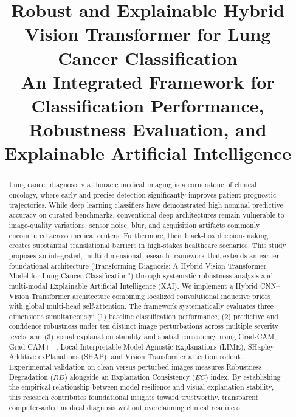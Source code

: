 \documentclass[conference]{IEEEtran}
\begin{document}
\title{Robust and Explainable Hybrid Vision Transformer for Lung Cancer Classification\\
\large An Integrated Framework for Classification Performance, Robustness Evaluation, and Explainable Artificial Intelligence}

\author{
}

\maketitle

\begin{abstract}
Lung cancer diagnosis via thoracic medical imaging is a cornerstone of clinical oncology, where early and precise detection significantly improves patient prognostic trajectories. While deep learning classifiers have demonstrated high nominal predictive accuracy on curated benchmarks, conventional deep architectures remain vulnerable to image-quality variations, sensor noise, blur, and acquisition artifacts commonly encountered across medical centers. Furthermore, their black-box decision-making creates substantial translational barriers in high-stakes healthcare scenarios. This study proposes an integrated, multi-dimensional research framework that extends an earlier foundational architecture (Transforming Diagnosis: A Hybrid Vision Transformer Model for Lung Cancer Classification'') through systematic robustness analysis and multi-modal Explainable Artificial Intelligence (XAI). We implement a Hybrid CNN--Vision Transformer architecture combining localized convolutional inductive priors with global multi-head self-attention. The framework systematically evaluates three dimensions simultaneously: (1) baseline classification performance, (2) predictive and confidence robustness under ten distinct image perturbations across multiple severity levels, and (3) visual explanation stability and spatial consistency using Grad-CAM, Grad-CAM++, Local Interpretable Model-Agnostic Explanations (LIME), SHapley Additive exPlanations (SHAP), and Vision Transformer attention rollout. Experimental validation on clean versus perturbed images measures Robustness Degradation ($RD$) alongside an Explanation Consistency ($EC$) index. By establishing the empirical relationship between model resilience and visual explanation stability, this research contributes foundational insights toward trustworthy, transparent computer-aided medical diagnosis without overclaiming clinical readiness.
\end{abstract}
\end{document}

